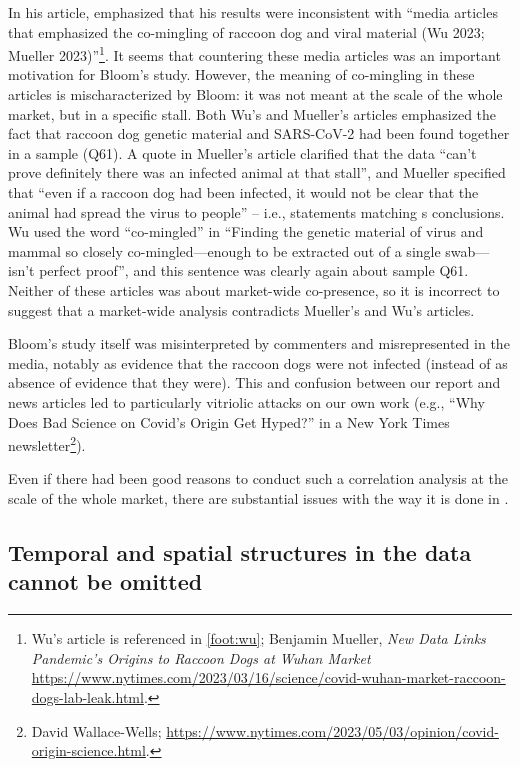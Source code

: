 \documentclass[11pt]{article}
\def \sct {\mbox{SARS-CoV-2}}
\begin{document}
In his article, \citet{Bloom2023VE} emphasized that his results were inconsistent with ``media articles that emphasized the co-mingling of raccoon dog and viral material (Wu 2023; Mueller 2023)''\footnote{Wu's article is referenced in \cref{foot:wu}; Benjamin Mueller, \textit{New Data Links Pandemic’s Origins to Raccoon Dogs at Wuhan Market} \url{https://www.nytimes.com/2023/03/16/science/covid-wuhan-market-raccoon-dogs-lab-leak.html}.}. It seems that countering these media articles was an important motivation for Bloom's study. However, the meaning of co-mingling in these articles is mischaracterized by Bloom: it was not meant at the scale of the whole market, but in a specific stall. Both Wu's and Mueller's articles emphasized the fact that raccoon dog genetic material and \sct{} had been found together in a sample (Q61). A quote in Mueller's article clarified that the data ``can't prove definitely there was an infected animal at that stall'', and Mueller specified that ``even if a raccoon dog had been infected, it would not be clear that the animal had spread the virus to people'' -- i.e., statements matching \citet{Bloom2023VE}s conclusions. Wu used the word ``co-mingled'' in ``Finding the genetic material of virus and mammal so closely co-mingled—enough to be extracted out of a single swab—isn't perfect proof'', and this sentence was clearly again about sample Q61. Neither of these articles was about market-wide co-presence, so it is incorrect to suggest that a market-wide analysis contradicts Mueller's and Wu's articles. 

Bloom's study itself was misinterpreted by commenters and misrepresented in the media, notably as evidence that the raccoon dogs were not infected (instead of as absence of evidence that they were). This and confusion between our report and news articles led to particularly vitriolic attacks on our own work (e.g., ``Why Does Bad Science on Covid’s Origin Get Hyped?'' in a New York Times newsletter\footnote{David Wallace-Wells; \url{https://www.nytimes.com/2023/05/03/opinion/covid-origin-science.html}.}). 

Even if there had been good reasons to conduct such a correlation analysis at the scale of the whole market, there are substantial issues with the way it is done in \citet{Bloom2023VE}.

\subsection{Temporal and spatial structures in the data cannot be omitted}
\end{document}
